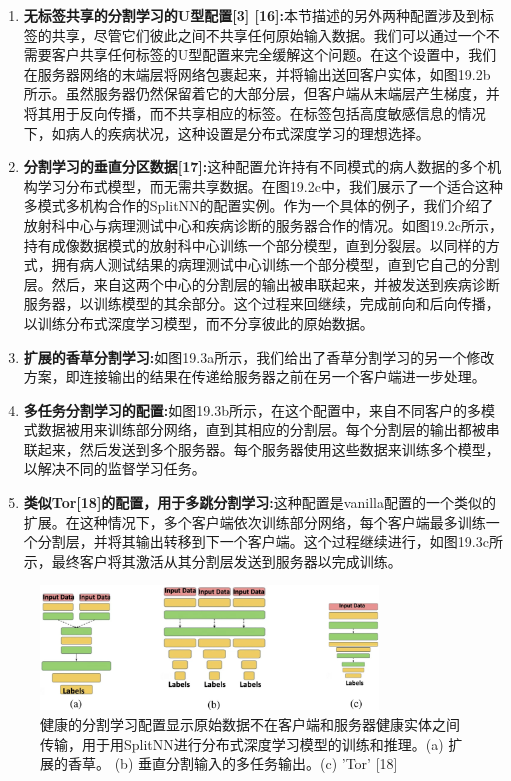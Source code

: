 \begin{enumerate}
	\item \textbf{无标签共享的分割学习的U型配置[3] [16]:}本节描述的另外两种配置涉及到标签的共享，尽管它们彼此之间不共享任何原始输入数据。我们可以通过一个不需要客户共享任何标签的U型配置来完全缓解这个问题。在这个设置中，我们在服务器网络的末端层将网络包裹起来，并将输出送回客户实体，如图19.2b所示。虽然服务器仍然保留着它的大部分层，但客户端从末端层产生梯度，并将其用于反向传播，而不共享相应的标签。在标签包括高度敏感信息的情况下，如病人的疾病状况，这种设置是分布式深度学习的理想选择。
	\item \textbf{分割学习的垂直分区数据[17]:}这种配置允许持有不同模式的病人数据的多个机构学习分布式模型，而无需共享数据。在图19.2c中，我们展示了一个适合这种多模式多机构合作的SplitNN的配置实例。作为一个具体的例子，我们介绍了放射科中心与病理测试中心和疾病诊断的服务器合作的情况。如图19.2c所示，持有成像数据模式的放射科中心训练一个部分模型，直到分裂层。以同样的方式，拥有病人测试结果的病理测试中心训练一个部分模型，直到它自己的分割层。然后，来自这两个中心的分割层的输出被串联起来，并被发送到疾病诊断服务器，以训练模型的其余部分。这个过程来回继续，完成前向和后向传播，以训练分布式深度学习模型，而不分享彼此的原始数据。
	\item \textbf{扩展的香草分割学习:}如图19.3a所示，我们给出了香草分割学习的另一个修改方案，即连接输出的结果在传递给服务器之前在另一个客户端进一步处理。
	\item \textbf{多任务分割学习的配置:}如图19.3b所示，在这个配置中，来自不同客户的多模式数据被用来训练部分网络，直到其相应的分割层。每个分割层的输出都被串联起来，然后发送到多个服务器。每个服务器使用这些数据来训练多个模型，以解决不同的监督学习任务。
	\item \textbf{类似Tor[18]的配置，用于多跳分割学习:}这种配置是vanilla配置的一个类似的扩展。在这种情况下，多个客户端依次训练部分网络，每个客户端最多训练一个分割层，并将其输出转移到下一个客户端。这个过程继续进行，如图19.3c所示，最终客户将其激活从其分割层发送到服务器以完成训练。
\end{enumerate}
\begin{figure}
	\centering
	\includegraphics[width=0.8\textwidth]{chapter19/images/Fig.19.3}
	\caption{健康的分割学习配置显示原始数据不在客户端和服务器健康实体之间传输，用于用SplitNN进行分布式深度学习模型的训练和推理。(a) 扩展的香草。 (b) 垂直分割输入的多任务输出。(c) 'Tor' [18]} \label{fig:19.3}
\end{figure}

